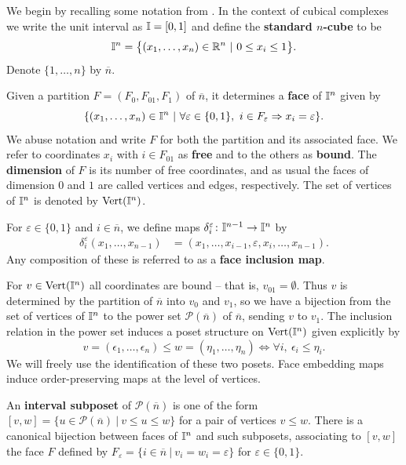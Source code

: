 We begin by recalling some notation from \cite{FMS-flows}. In the context of cubical complexes we write the unit interval as $\mathbb{I} = [0,1]$ and define the \textbf{standard $n$-cube} to be
\begin{equation*}
\mathbb{I}^n = \big\{ (x_1, \dots, x_n) \in \mathbb{R}^n\ |\ 0 \leq x_i \leq 1 \big\}.
\end{equation*}
Denote $\{1, \dots, n\}$ by $\overline{n}$.

Given a partition $F = (F_0, F_{01}, F_1)$ of $\overline n$, it determines a \textbf{face} of $\mathbb{I}^n$ given by
\begin{equation*}
\{(x_1, \dots, x_n) \in \mathbb{I}^n\ |\ \forall \varepsilon \in \{0, 1\},\ i \in F_\varepsilon \Rightarrow x_i = \varepsilon\}.
\end{equation*}
We abuse notation and write $F$ for both the partition and its associated face. We refer to coordinates $x_i$ with $i \in F_{01}$ as \textbf{free} and to the others as \textbf{bound}.
The \textbf{dimension} of $F$ is its number of free coordinates, and as usual the faces of dimension $0$ and $1$ are called vertices and edges, respectively. The set of vertices of $\mathbb{I}^n$ is denoted by ${\rm Vert}(\mathbb{I}^n)$.

For $\varepsilon \in \{0, 1\}$ and $i \in \overline{n}$, we define maps $\delta_i^\varepsilon \colon \mathbb{I}^{n-1} \to \mathbb{I}^{n}$ by
\begin{align*}
\delta_i^\varepsilon(x_1, \dots, x_{n-1}) & = (x_1, \dots, x_{i-1}, \varepsilon, x_i, \dots, x_{n-1}).
\end{align*}
Any composition of these is referred to as a \textbf{face inclusion map}.

For $v \in {\rm Vert}(\mathbb{I}^n)$ all coordinates are bound -- that is, $v_{01} = \emptyset$. Thus
 $v$ is determined by the partition of $\overline n$ into $v_0$ and $v_1$, so
we have a bijection from the set of vertices of $\mathbb{I}^n$ to the power set $\mathcal P(\overline n)$ of $\overline n$, sending $v$ to $v_1$.
The inclusion relation in the power set induces a poset structure on ${\rm Vert}(\mathbb{I}^n)$ given explicitly by
\begin{equation*}
v = (\epsilon_1, \dots, \epsilon_n) \leq w = (\eta_1, \dots, \eta_n) \iff \forall i,\ \epsilon_i \leq \eta_i.
\end{equation*}
We will freely use the identification of these two posets.
Face embedding maps induce order-preserving maps at the level of vertices.

An \textbf{interval subposet} of $\mathcal P(\overline n)$ is one of the form $[v, w] = \{u \in \mathcal P(\overline n)\ |\ v \leq u \leq w\}$ for a pair of vertices $v \leq w$. There is a canonical bijection between faces of $\mathbb{I}^n$ and such subposets, associating to $[v, w]$ the face $F$ defined by $F_\varepsilon = \{i \in \overline{n}\ |\ v_i = w_i = \varepsilon\}$ for $\varepsilon \in \{0, 1\}$.

